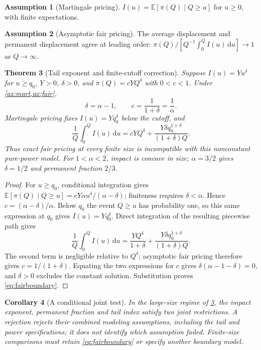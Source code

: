 \documentclass[11pt]{article}
\numberwithin{equation}{section}
\newtheorem{theorem}{Theorem}[section]
\newtheorem{corollary}[theorem]{Corollary}
\theoremstyle{definition}
\theoremstyle{remark}
\newcommand{\E}{\mathbb{E}}
\theoremstyle{definition}
\newtheorem{assumption}[theorem]{Assumption}
\newcommand{\dd}{\,\mathrm d}
\begin{document}
\begin{assumption}[Martingale pricing]\label{ax:mart}
$I(u)=\E[\pi(Q)\mid Q\ge u]$ for $u\ge0$, with finite expectations.
\end{assumption}

\begin{assumption}[Asymptotic fair pricing]\label{ax:fair}
The average displacement and permanent displacement agree at leading order:
$\pi(Q)/[Q^{-1}\int_0^Q I(u)\dd u]\to1$ as $Q\to\infty$.
\end{assumption}

\begin{theorem}[Tail exponent and finite-cutoff correction]\label{thm:exponent}
Suppose $I(u)=Yu^\delta$ for $u\ge q_0$, $Y>0$, $\delta>0$,
and $\pi(Q)=cYQ^\delta$ with $0<c<1$. Under
\cref{ax:mart,ax:fair},
\begin{equation}\label{eq:exponent}
 \delta=\alpha-1,\qquad c=\frac1{1+\delta}=\frac1\alpha.
\end{equation}
Martingale pricing fixes $I(u)=Yq_0^\delta$ below the cutoff, and
\begin{equation}\label{eq:fairboundary}
 \frac1Q\int_0^Q I(u)\dd u
 =cYQ^\delta+
   \frac{Y\delta q_0^{1+\delta}}{(1+\delta)Q}.
\end{equation}
Thus exact fair pricing at every finite size is incompatible with this
nonconstant pure-power model. For $1<\alpha<2$, impact is concave in size;
$\alpha=3/2$ gives $\delta=1/2$ and permanent fraction $2/3$.
\end{theorem}
\begin{proof}
For $u\ge q_0$, conditional integration gives
$\E[\pi(Q)\mid Q\ge u]=cY\alpha u^\delta/(\alpha-\delta)$;
finiteness requires $\delta<\alpha$. Hence
$c=(\alpha-\delta)/\alpha$. Below $q_0$ the event $Q\ge u$ has
probability one, so this same expression at $q_0$ gives $I(u)=Yq_0^\delta$.
Direct integration of the resulting piecewise path gives
\[
 \frac1Q\int_0^Q I(u)\dd u
 =\frac{YQ^\delta}{1+\delta}
  +\frac{Y\delta q_0^{1+\delta}}{(1+\delta)Q}.
\]
The second term is negligible relative to $Q^\delta$; asymptotic fair pricing
therefore gives $c=1/(1+\delta)$. Equating the two expressions for $c$
gives $\delta(\alpha-1-\delta)=0$, and $\delta>0$ excludes the constant
solution. Substitution proves \eqref{eq:fairboundary}.
\end{proof}

\begin{corollary}[A conditional joint test]\label{cor:jointtest}
In the large-size regime of \cref{thm:exponent}, the impact exponent,
permanent fraction and tail index satisfy two joint restrictions. A rejection
rejects their combined modeling assumptions, including the tail and power
specifications; it does not identify which assumption failed. Finite-size
comparisons must retain \eqref{eq:fairboundary} or specify another boundary
model.
\end{corollary}
\end{document}
